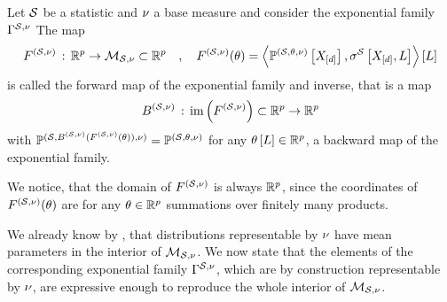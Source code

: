 \begin{definition}
    \label{def:meanForwardBackward}
    Let $\mathcal{S}$ be a statistic and $\nu$ a base measure and consider the exponential family $\Gamma^{\mathcal{S},\nu}$
    The map
    \begin{align*}
        F^{(\mathcal{S},\nu)} \,:\, \mathbb{R}^{p}\rightarrow\mathcal{M}_{\mathcal{S},\nu}\subset\mathbb{R}^{p}
        \quad,\quad F^{(\mathcal{S},\nu)}(\theta) = \left\langle \mathbb{P}^{(\mathcal{S},\theta,\nu)}\left[X_{[d]}\right],\sigma^{\mathcal{S}}\left[X_{[d]},L\right]\right\rangle \left[ L \right]
    \end{align*}
    is called the forward map of the exponential family and inverse, that is a map
    \begin{align*}
        B^{(\mathcal{S},\nu)} \,:\, \mathrm{im}\left(F^{(\mathcal{S},\nu)}\right) \subset\mathbb{R}^{p}\rightarrow \mathbb{R}^{p}
    \end{align*}
    with $\mathbb{P}^{(\mathcal{S},B^{(\mathcal{S},\nu)}(F^{(\mathcal{S},\nu)}(\theta)),\nu)} = \mathbb{P}^{(\mathcal{S},\theta,\nu)}$ for any $\theta\left[L\right]\in\mathbb{R}^{p}$, a backward map of the exponential family.
\end{definition}

We notice, that the domain of $F^{(\mathcal{S},\nu)}$ is always $\mathbb{R}^{p}$, since the coordinates of $F^{(\mathcal{S},\nu)}(\theta)$ are for any $\theta\in\mathbb{R}^{p}$ summations over finitely many products.

%
We already know by , that distributions representable by $\nu$ have mean parameters in the interior of $\mathcal{M}_{\mathcal{S},\nu}$.
We now state that the elements of the corresponding exponential family $\Gamma^{\mathcal{S},\nu}$, which are by construction representable by $\nu$, are expressive enough to reproduce the whole interior of $\mathcal{M}_{\mathcal{S},\nu}$.

